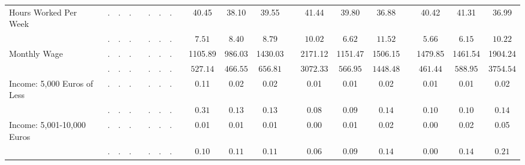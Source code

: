 \begin{center}
{\begin{longtable}{L{5cm} c c c p{.5cm} c c c p{.5cm} c c c p{.5cm} c c c p{.5cm} c c c}
 \quad Hours Worked Per Week & . &         . &         . & &         . &         . &         . & &     40.45 &     38.10 &     39.55 & &     41.44 &     39.80 &     36.88 & &     40.42 &     41.31 &     36.99 \\*
 \quad & $\mathit{        .}$ & $\mathit{        .}$ & $\mathit{        .}$ & & $\mathit{        .}$ & $\mathit{        .}$ & $\mathit{        .}$ & & $\mathit{     7.51}$ & $\mathit{     8.40}$ & $\mathit{     8.79}$ & & $\mathit{    10.02}$ & $\mathit{     6.62}$ & $\mathit{    11.52}$ & & $\mathit{     5.66}$ & $\mathit{     6.15}$ & $\mathit{    10.22}$ \\[.2em]
 \quad Monthly Wage & . &         . &         . & &         . &         . &         . & &   1105.89 &    986.03 &   1430.03 & &   2171.12 &   1151.47 &   1506.15 & &   1479.85 &   1461.54 &   1904.24 \\*
 \quad & $\mathit{        .}$ & $\mathit{        .}$ & $\mathit{        .}$ & & $\mathit{        .}$ & $\mathit{        .}$ & $\mathit{        .}$ & & $\mathit{   527.14}$ & $\mathit{   466.55}$ & $\mathit{   656.81}$ & & $\mathit{  3072.33}$ & $\mathit{   566.95}$ & $\mathit{  1448.48}$ & & $\mathit{   461.44}$ & $\mathit{   588.95}$ & $\mathit{  3754.54}$ \\[.2em]
 \quad Income: 5,000 Euros of Less & . &         . &         . & &         . &         . &         . & &      0.11 &      0.02 &      0.02 & &      0.01 &      0.01 &      0.02 & &      0.01 &      0.01 &      0.02 \\*
 \quad & $\mathit{        .}$ & $\mathit{        .}$ & $\mathit{        .}$ & & $\mathit{        .}$ & $\mathit{        .}$ & $\mathit{        .}$ & & $\mathit{     0.31}$ & $\mathit{     0.13}$ & $\mathit{     0.13}$ & & $\mathit{     0.08}$ & $\mathit{     0.09}$ & $\mathit{     0.14}$ & & $\mathit{     0.10}$ & $\mathit{     0.10}$ & $\mathit{     0.14}$ \\[.2em]
 \quad Income: 5,001-10,000 Euros & . &         . &         . & &         . &         . &         . & &      0.01 &      0.01 &      0.01 & &      0.00 &      0.01 &      0.02 & &      0.00 &      0.02 &      0.05 \\*
 \quad & $\mathit{        .}$ & $\mathit{        .}$ & $\mathit{        .}$ & & $\mathit{        .}$ & $\mathit{        .}$ & $\mathit{        .}$ & & $\mathit{     0.10}$ & $\mathit{     0.11}$ & $\mathit{     0.11}$ & & $\mathit{     0.06}$ & $\mathit{     0.09}$ & $\mathit{     0.14}$ & & $\mathit{     0.00}$ & $\mathit{     0.14}$ & $\mathit{     0.21}$ \\[.2em]

\end{longtable}}
\end{center}
